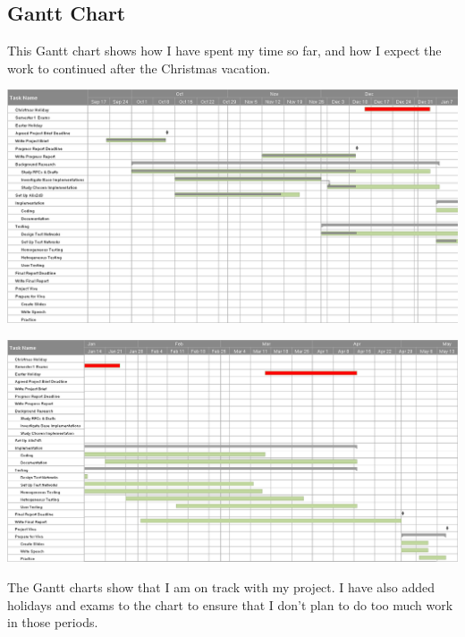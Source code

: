 \documentclass[12pt]{report}
\begin{document}
\begin{landscape}

\section{Gantt Chart}
This Gantt chart shows how I have spent my time so far, and how I expect the
work to continued after the Christmas vacation.

\begin{center}
\includegraphics[width=\linewidth]{../Gantt/GanttPart1.png}
\end{center}

\begin{center}
\includegraphics[width=\linewidth]{../Gantt/GanttPart2.png}
\end{center}

The Gantt charts show that I am on track with my project. I have also added
holidays and exams to the chart to ensure that I don't plan to do too much work
in those periods. 

\end{landscape}

\pagebreak

\printnomenclature

\pagebreak
\end{document}
